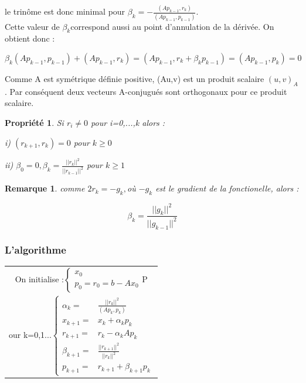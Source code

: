 \documentclass[12,french]{report}
\newtheorem{proposition}{Propriété}[theorem]
\newtheorem{remark}{Remarque}[theorem]
\begin{document}
le trinôme est donc minimal pour $\beta_{k}=-\frac{(Ap_{k-1},r_{k})}{(Ap_{k-1},p_{k-1})}$.\\

Cette valeur de $\beta_{k}$correspond aussi au point d'annulation
de la dérivée. On obtient donc :

$$\beta_{k}(Ap_{k-1},p_{k-1})+(Ap_{k-1},r_{k})=(Ap_{k-1},r_{k}+\beta_{k}p_{k-1})=(Ap_{k-1},p_{k})=0$$

Comme A est symétrique définie positive, (Au,v) est un produit scalaire
$(u,v)_{A}$. Par conséquent deux vecteurs A-conjugués sont orthogonaux
pour ce produit scalaire.

\begin{proposition}
Si $r_{i}\neq0$ pour i=0,...,k alors :
\item [{i)}] $(r_{k+1},r_{k})=0$ pour $k\geq0$
\item [{ii)}] $\beta_{0}=0,\beta_{k}=\frac{||r_{k}||^{2}}{||r_{k-1}||^{2}}$
pour $k\geq1$
\end{proposition}

\begin{remark}
comme $2r_{k}=-g_{k},$où $-g_{k}$ est le gradient de la fonctionelle,
alors :

\[
\beta_{k}=\frac{||g_{k}||^{2}}{||g_{k-1}||^{2}}
\]

\end{remark}

\subsubsection{L'algorithme}

\begin{center}
	\begin{tabular}{|c|}
		\hline 
		On initialise :$\begin{cases}
			x_{0}\\
			p_{0}=r_{0}=b-Ax_{0}
		\end{cases}$P\tabularnewline
		our k=0,1...$\begin{cases}
			\alpha_{k}= & \frac{||r_{k}||^{2}}{(Ap_{k},p_{k})}\\
			x_{k+1}= & x_{k}+\alpha_{k}p_{k}\\
			r_{k+1}= & r_{k}-\alpha_{k}Ap_{k}\\
			\beta_{k+1}= & \frac{||r_{k+1}||^{2}}{||r_{k}||^{2}}\\
			p_{k+1}= & r_{k+1}+\beta_{k+1}p_{k}
		\end{cases}$\tabularnewline
		\hline 
	\end{tabular}
\end{center}
\end{document}
